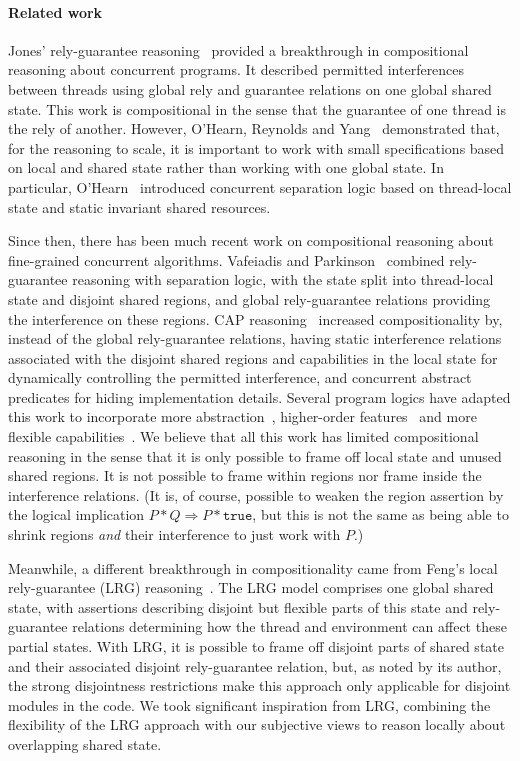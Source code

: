 \paragraph{Related work}
Jones' rely-guarantee reasoning~\cite{rg} provided a breakthrough in
compositional reasoning about concurrent programs. It described
permitted interferences between threads using global rely and
guarantee relations on one  global shared state. This work is
compositional in the sense that the guarantee of one thread is the
rely of another. However, O'Hearn, Reynolds and
Yang~\cite{o2001local} demonstrated that, for the
reasoning to scale, it is important to work with small specifications
based on local and shared state rather than working with one
global state. In particular, O'Hearn~\cite{csl-tcs} introduced concurrent
separation logic based on thread-local state and static invariant
shared resources.


Since then, there has been much recent work on compositional
reasoning about fine-grained concurrent algorithms. Vafeiadis and
Parkinson~\cite{viktor-marriage} combined rely-guarantee reasoning with
separation logic, with the state split into thread-local state and
disjoint shared regions, and global rely-guarantee relations providing
the interference on these regions. 
CAP reasoning~\cite{cap-ecoop10} increased  compositionality by, instead of the
global
rely-guarantee relations, having static interference relations
associated with the disjoint shared regions and capabilities in the local
state for dynamically controlling the permitted  interference, and concurrent
abstract predicates for hiding implementation details. Several
program logics have adapted this work to incorporate more
abstraction~\cite{caresl}, higher-order features~\cite{icap} and more flexible
capabilities~\cite{tada}. We believe that all  this work has  limited compositional
reasoning in the sense that it is only possible to frame off local
state and unused shared regions. It is not possible to 
frame within regions nor frame inside the interference
relations.  (It is, of course, possible to weaken the region assertion
by the logical implication $P * Q \Rightarrow P * \texttt{true}$, but this is
not the same as being able to shrink regions \emph{and} their interference to
just work with $P$.) 

Meanwhile, a different breakthrough in compositionality came from
Feng's local rely-guarantee (LRG) reasoning~\cite{lrg}. The LRG model
comprises one global shared state, with assertions describing
{disjoint} but flexible parts of this state and rely-guarantee
relations determining how the thread and environment can affect these
partial states. With LRG, it is possible to frame off disjoint parts of
shared state and their associated disjoint rely-guarantee relation, but, as noted
by its author, the strong disjointness restrictions make this approach
only applicable for disjoint modules in the code. We took significant
inspiration from LRG, combining the flexibility of the LRG approach
with our subjective views to reason locally about overlapping shared
state.

